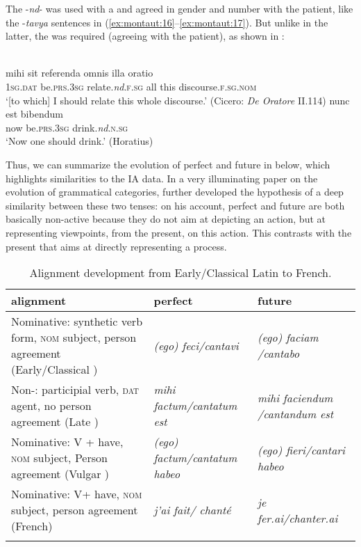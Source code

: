 \documentclass[output=paper]{langsci/langscibook}
\begin{document}
The -\textit{nd}{}-  was used with a  and agreed in gender and number with the  patient, like the -\textit{tavya} sentences in (\ref{ex:montaut:16}--\ref{ex:montaut:17}). But unlike in the latter, the  was required (agreeing with the  patient), as shown in : 

\ea\label{ex:montaut:25}
\ea 
{}\\
\gll mihi  sit  referenda  omnis illa oratio\\
\textsc{1sg.dat}   be.\textsc{prs.3sg}   relate.\textit{nd}.\textsc{f.sg}   all this discourse\textsc{.f.sg.nom}   \\
\glt ‘[to which]  I should relate this whole discourse.’ (Cicero: \textit{De Oratore} II.114)
\ex  
\gll nunc est  bibendum\\
now   be.\textsc{prs.3sg}    drink.\textit{nd}.\textsc{n.sg}   \\
\glt ‘Now one should drink.’ (Horatius)
\z 
\z 

Thus, we can summarize the  evolution of perfect and future in  below, which highlights similarities to the IA data. In a very illuminating paper on the evolution of grammatical categories, \citet{Kuryłowicz1965} further developed the hypothesis of a deep similarity between these two tenses: on his account, perfect and future are both basically non-active because they do not aim at depicting an action, but at representing viewpoints, from the present, on this action. This contrasts with the present that aims at directly representing a process.
\begin{table}
\begin{tabularx}{\textwidth}{QQQ}
\lsptoprule
alignment & perfect & future\\
\midrule
Nominative: synthetic verb form, \textsc{nom} 
subject, person agreement (Early/Classical ) & \textit{(ego) feci/cantavi} & \textit{(ego) faciam /cantabo}\\
\tablevspace
Non-: participial verb, \textsc{dat} 
agent, no person agreement (Late ) & \textit{mihi factum/cantatum est} & \textit{mihi faciendum /cantandum est}\\
\tablevspace
Nominative: V + have, \textsc{nom} subject, 
Person agreement (Vulgar ) & \textit{(ego) factum/cantatum habeo} & \textit{(ego) fieri/cantari habeo}\\
\tablevspace
Nominative: V+ have, \textsc{nom} subject, 
person agreement (French) & \textit{j’ai fait/ chanté} & \textit{je fer.ai/chanter.ai}\\
\lspbottomrule
\end{tabularx}
\caption{Alignment development from Early/Classical Latin to French.}
\label{tab:montaut:2}
\end{table}
\end{document}
